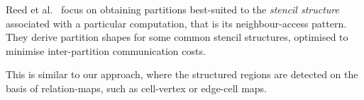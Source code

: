 
Reed et al.~\cite{reed1987stencils} focus on obtaining partitions best-suited to the \emph{stencil structure} associated with a particular computation, that is its neighbour-access pattern. They derive partition shapes for some common stencil structures, optimised to minimise inter-partition communication costs.

This is similar to our approach, where the structured regions are detected on the basis of relation-maps, such as cell-vertex or edge-cell maps.



















